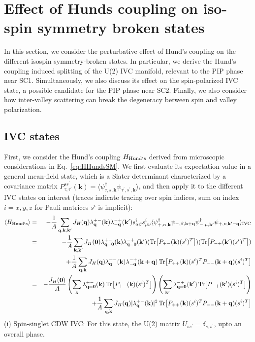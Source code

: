 \documentclass[aps,pra,twocolumn,superscriptaddress,10pt,article,nofootinbib,showpacs,longbibliography]{revtex4-1}
\def \k{{\mathbf k}}
\def \q{{\mathbf q}}
\def \beq{\begin{eqnarray}}
\def \eeq{\end{eqnarray}}
\def \nn{\nonumber \\}
\begin{document}
\section{Effect of Hunds coupling on iso-spin symmetry broken states}
In this section, we consider the perturbative effect of Hund's coupling on the different isospin symmetry-broken states.
In particular, we derive the Hund's coupling induced splitting of the U(2) IVC manifold, relevant to the PIP phase near SC1.
Simultaneously, we also discuss its effect on the spin-polarized IVC state, a possible candidate for the PIP phase near SC2. 
Finally, we also consider how inter-valley scattering can break the degeneracy between spin and valley polarization.

\subsection{IVC states}
First, we consider the Hund's coupling $H_{\rm Hund's}$ derived from microscopic considerations in Eq.~\eqref{eq:HHundsSM}.
We first evaluate its expectation value in a general mean-field state, which is a Slater determinant characterized by a covariance matrix $P_{\tau,\tau^\prime}^{s s^\prime}(\k) = \langle \psi^\dagger_{\tau,s,\k} \psi_{\tau^\prime, s^\prime, \k} \rangle$, and then apply it to the different IVC states on interest (traces indicate tracing over spin indices, sum on index $i=x,y,z$ for Pauli matrices $s^i$ is implicit):
\beq
\langle H_{\rm Hund's} \rangle &=& - \frac{1}{A} \sum_{\q, \k, \k^\prime} J_H(\q) \lambda^{+-}_\q(\k) \lambda^{-+}_{-\q}(\k^\prime) s^i_{\alpha \beta} s^i_{\mu \nu} \langle \psi^\dagger_{+,\alpha,\k} \psi_{-,\beta, \k + \q} \psi^\dagger_{-,\mu,\k^\prime} \psi_{+,\nu,\k^\prime - \q} \rangle_{\rm IVC} \nn
& =& - \frac{1}{A} \sum_{\k, \k^\prime} J_H(\mathbf{0}) \lambda^{+-}_{\q = \mathbf{0}}(\k) \lambda^{-+}_{\q = \mathbf{0}}(\k^\prime)    (\Tr[P_{+-}(\k) (s^i)^T]) (\Tr[P_{-+}(\k^\prime) (s^i)^T])  \nn 
&& + \frac{1}{A} \sum_{\q, \k} J_H(\q) \lambda^{+-}_{\q}(\k) \lambda^{-+}_{-\q}(\k+\q) \Tr[P_{++}(\k)(s^i)^T P_{--}(\k+\q) (s^i)^T ]\nn
& = & - \frac{J_H(\mathbf{0})}{A}  \left( \sum_\k \lambda^{+-}_{\q = \mathbf{0}}(\k) \Tr[P_{+-}(\k) (s^i)^T]  \right) \left( \sum_{\k^\prime} \lambda^{-+}_{\q = \mathbf{0}}(\k^\prime) \Tr[P_{-+}(\k^\prime) (s^i)^T] \right)  \nn
& &  + \frac{1}{A} \sum_{\q, \k} J_H(\q) |\lambda^{+-}_{\q}(\k)|^2 \Tr[P_{++}(\k)(s^i)^T P_{--}(\k+\q) (s^i)^T ]
\label{eq:HHund'sIVC}
\eeq
(i) Spin-singlet CDW IVC: For this state, the U(2) matrix $U_{s s^\prime} = \delta_{s,s^\prime}$, upto an overall phase.
\end{document}
